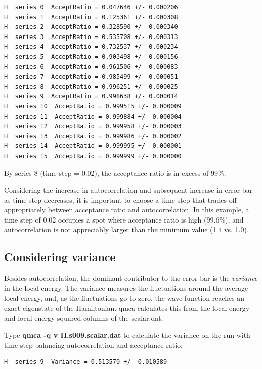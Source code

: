 \begin{shaded} 
\begin{verbatim} 
H  series 0  AcceptRatio = 0.047646 +/- 0.000206 
H  series 1  AcceptRatio = 0.125361 +/- 0.000308 
H  series 2  AcceptRatio = 0.328590 +/- 0.000340 
H  series 3  AcceptRatio = 0.535708 +/- 0.000313 
H  series 4  AcceptRatio = 0.732537 +/- 0.000234 
H  series 5  AcceptRatio = 0.903498 +/- 0.000156 
H  series 6  AcceptRatio = 0.961506 +/- 0.000083 
H  series 7  AcceptRatio = 0.985499 +/- 0.000051 
H  series 8  AcceptRatio = 0.996251 +/- 0.000025 
H  series 9  AcceptRatio = 0.998638 +/- 0.000014 
H  series 10  AcceptRatio = 0.999515 +/- 0.000009 
H  series 11  AcceptRatio = 0.999884 +/- 0.000004 
H  series 12  AcceptRatio = 0.999958 +/- 0.000003 
H  series 13  AcceptRatio = 0.999986 +/- 0.000002 
H  series 14  AcceptRatio = 0.999995 +/- 0.000001 
H  series 15  AcceptRatio = 0.999999 +/- 0.000000 
\end{verbatim} 
\end{shaded}

By series 8 (time step = 0.02), the acceptance ratio is in excess of 99\%.  

Considering the increase in autocorrelation and subsequent increase in error
bar as time step decreases, it is important to choose a time step that trades
off appropriately between acceptance ratio and autocorrelation.  In this
example, a time step of 0.02 occupies a spot where acceptance ratio is high
(99.6\%), and autocorrelation is not appreciably larger than the minimum value
(1.4 vs. 1.0).

\subsection{Considering variance}

Besides autocorrelation, the dominant contributor to the error bar is the
\textit{variance} in the local energy.  The variance measures the fluctuations
around the average local energy, and, as the fluctuations go to zero, the wave
function reaches an exact eigenstate of the Hamiltonian.  qmca calculates this
from the local energy and local energy squared columns of the scalar.dat. 

Type \textbf{qmca -q v H.s009.scalar.dat} to calculate the variance on the run
with time step balancing autocorrelation and acceptance ratio:

\begin{shaded}
\begin{verbatim}
H  series 9  Variance = 0.513570 +/- 0.010589  
\end{verbatim}
\end{shaded}

